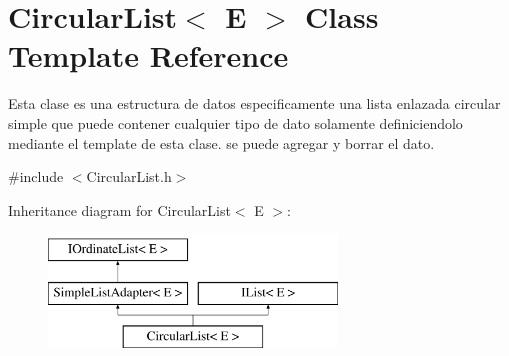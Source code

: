 \hypertarget{class_circular_list}{\section{Circular\-List$<$ E $>$ Class Template Reference}
\label{class_circular_list}
}


Esta clase es una estructura de datos especificamente una lista enlazada circular simple que puede contener cualquier tipo de dato solamente definiciendolo mediante el template de esta clase. se puede agregar y borrar el dato.  




{\ttfamily \#include $<$Circular\-List.\-h$>$}

Inheritance diagram for Circular\-List$<$ E $>$\-:\begin{figure}[H]
\begin{center}
\leavevmode
\includegraphics[height=3.000000cm]{class_circular_list}
\end{center}
\end{figure}
